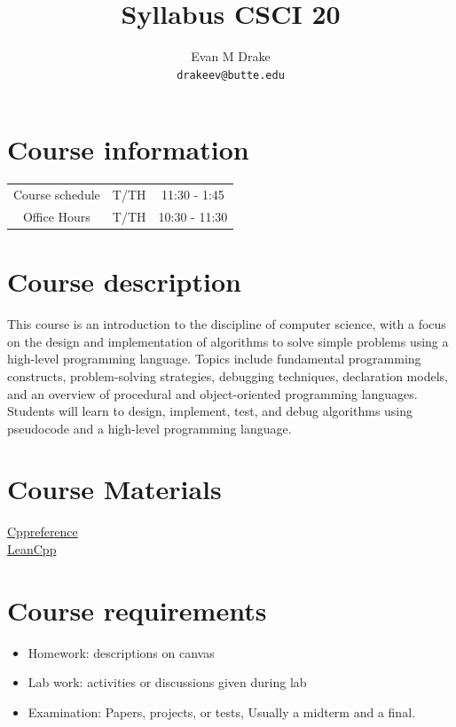 \documentclass[12pt]{article}
\title{Syllabus CSCI 20}
\author{
	Evan M Drake \\
	\texttt{drakeev@butte.edu}
}
\begin{document}
	\maketitle
	\section*{Course information}
		\begin{center}
			\begin{tabular} { c c c }
				Course schedule & T/TH & 11:30 - 1:45 \\
				Office Hours & T/TH & 10:30 - 11:30
			\end{tabular}
		\end{center}

	\section*{Course description}
		This course is an introduction to the discipline of computer science, with a focus on the design and implementation of algorithms to solve simple problems using a high-level programming language. Topics include fundamental programming constructs, problem-solving strategies, debugging techniques, declaration models, and an overview of procedural and object-oriented programming languages. Students will learn to design, implement, test, and debug algorithms using pseudocode and a high-level programming language.

	\section*{Course Materials}
		\href{https://cppreference.com/}{Cppreference} \\
		\href{https://learncpp.com/}{LeanCpp}

	\section*{Course requirements}
		\begin{center}
			\begin{itemize}
				\item Homework: descriptions on canvas
				\item Lab work: activities or discussions given during lab
				\item Examination: Papers, projects, or tests, Usually a midterm and a final.
			\end{itemize}
		\end{center}
\end{document}

